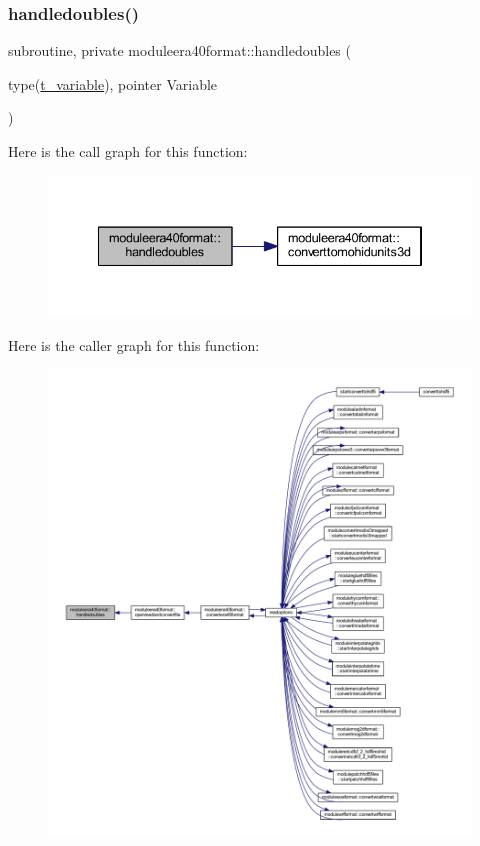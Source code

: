 \subsubsection{\texorpdfstring{handledoubles()}{handledoubles()}}
{\footnotesize\ttfamily subroutine, private moduleera40format\+::handledoubles (\begin{DoxyParamCaption}\item[{type(\mbox{\hyperlink{structmoduleera40format_1_1t__variable}{t\+\_\+variable}}), pointer}]{Variable }\end{DoxyParamCaption})\hspace{0.3cm}{\ttfamily [private]}}

Here is the call graph for this function\+:\nopagebreak
\begin{figure}[H]
\begin{center}
\leavevmode
\includegraphics[width=334pt]{namespacemoduleera40format_a54957082dfc56590cf35c0fb8138161f_cgraph}
\end{center}
\end{figure}
Here is the caller graph for this function\+:\nopagebreak
\begin{figure}[H]
\begin{center}
\leavevmode
\includegraphics[width=350pt]{namespacemoduleera40format_a54957082dfc56590cf35c0fb8138161f_icgraph}
\end{center}
\end{figure}
